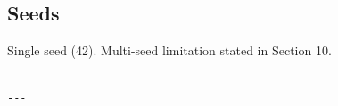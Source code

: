 \subsection{Seeds}

Single seed (42). Multi-seed limitation stated in Section 10.
\begin{lstlisting}

---
\end{lstlisting}